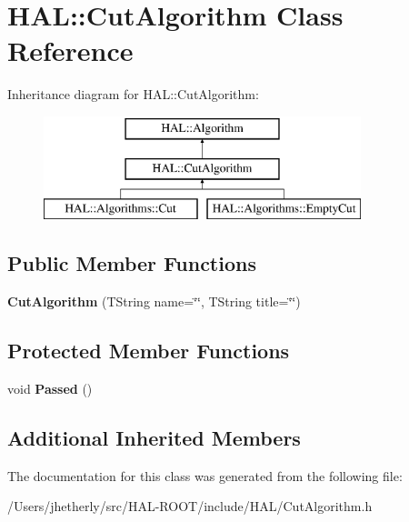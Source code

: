 \hypertarget{class_h_a_l_1_1_cut_algorithm}{\section{H\+A\+L\+:\+:Cut\+Algorithm Class Reference}
\label{class_h_a_l_1_1_cut_algorithm}
}
Inheritance diagram for H\+A\+L\+:\+:Cut\+Algorithm\+:\begin{figure}[H]
\begin{center}
\leavevmode
\includegraphics[height=3.000000cm]{class_h_a_l_1_1_cut_algorithm}
\end{center}
\end{figure}
\subsection*{Public Member Functions}
\begin{DoxyCompactItemize}
\item 
\hypertarget{class_h_a_l_1_1_cut_algorithm_a7009161a2b8463fddb9d6336cb2ef669}{{\bfseries Cut\+Algorithm} (T\+String name=\char`\"{}\char`\"{}, T\+String title=\char`\"{}\char`\"{})}\label{class_h_a_l_1_1_cut_algorithm_a7009161a2b8463fddb9d6336cb2ef669}

\end{DoxyCompactItemize}
\subsection*{Protected Member Functions}
\begin{DoxyCompactItemize}
\item 
\hypertarget{class_h_a_l_1_1_cut_algorithm_ad41a2ea5664562c3331f85bcc85317be}{void {\bfseries Passed} ()}\label{class_h_a_l_1_1_cut_algorithm_ad41a2ea5664562c3331f85bcc85317be}

\end{DoxyCompactItemize}
\subsection*{Additional Inherited Members}


The documentation for this class was generated from the following file\+:\begin{DoxyCompactItemize}
\item 
/\+Users/jhetherly/src/\+H\+A\+L-\/\+R\+O\+O\+T/include/\+H\+A\+L/Cut\+Algorithm.\+h\end{DoxyCompactItemize}
